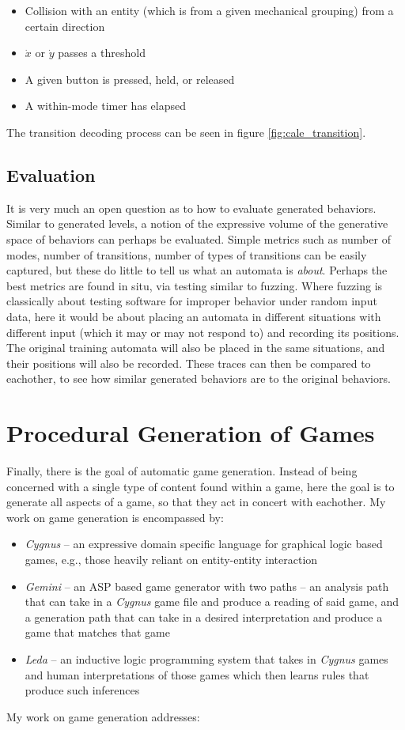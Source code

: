 \documentclass[12pt]{report}
\begin{document}
\begin{itemize}
\item Collision with an entity (which is from a given mechanical grouping) from a certain direction
\item  $\dot{x}$ or  $\dot{y}$ passes a threshold
\item A given button is pressed, held, or released
\item A within-mode timer has elapsed
\end{itemize}

The transition decoding process can be seen in figure \ref{fig:cale_transition}.


\section*{Evaluation}

It is very much an open question as to how to evaluate generated behaviors.  Similar to generated levels, a notion of the expressive volume of the generative space of behaviors can perhaps be evaluated.  Simple metrics such as number of modes, number of transitions, number of types of transitions can be easily captured, but these do little to tell us what an automata is \textit{about}.  Perhaps the best metrics are found in situ, via testing similar to fuzzing.  Where fuzzing is classically about testing software for improper behavior under random input data, here it would be about placing an automata in different situations with different input (which it may or may not respond to) and recording its positions.  The original training automata will also be placed in the same situations, and their positions will also be recorded.  These traces can then be compared to eachother, to see how similar generated behaviors are to the original behaviors.

\chapter*{Procedural Generation of Games}

Finally, there is the goal of automatic game generation. Instead of being concerned with a single type of content found within a game, here the goal is to generate all aspects of a game, so that they act in concert with eachother.  My work on game generation is encompassed by:
\begin{itemize}
\item \textit{Cygnus} -- an expressive domain specific language for graphical logic based games, e.g., those heavily reliant on entity-entity interaction
\item \textit{Gemini} -- an ASP based game generator with two paths -- an analysis path that can take in a \textit{Cygnus} game file and produce a reading of said game, and a generation path that can take in a desired interpretation and produce a game that matches that game
\item \textit{Leda} -- an inductive logic programming system that takes in \textit{Cygnus} games and human interpretations of those games which then learns rules that produce such inferences

\end{itemize}
My work on game generation addresses:
\end{document}
